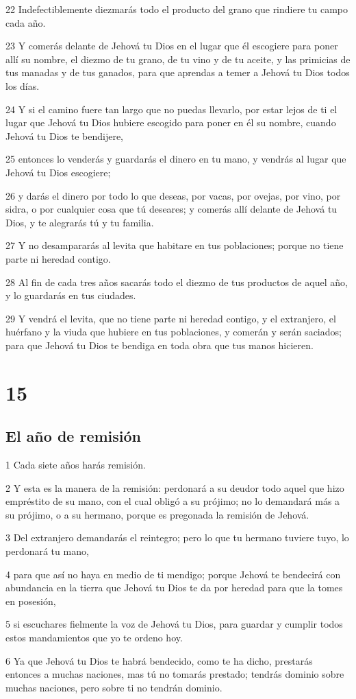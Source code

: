 \par 22 Indefectiblemente diezmarás  todo el producto del grano que rindiere tu campo cada año.
\par 23 Y comerás delante de Jehová tu Dios en el lugar que él escogiere para poner allí su nombre, el diezmo de tu grano, de tu vino y de tu aceite, y las primicias de tus manadas y de tus ganados, para que aprendas a temer a Jehová tu Dios todos los días.
\par 24 Y si el camino fuere tan largo que no puedas llevarlo, por estar lejos de ti el lugar que Jehová tu Dios hubiere escogido para poner en él su nombre, cuando Jehová tu Dios te bendijere,
\par 25 entonces lo venderás y guardarás el dinero en tu mano, y vendrás al lugar que Jehová tu Dios escogiere;
\par 26 y darás el dinero por todo lo que deseas, por vacas, por ovejas, por vino, por sidra, o por cualquier cosa que tú deseares; y comerás allí delante de Jehová tu Dios, y te alegrarás tú y tu familia.
\par 27 Y no desampararás al levita que habitare en tus poblaciones; porque no tiene parte ni heredad contigo.
\par 28 Al fin de cada tres años sacarás todo el diezmo de tus productos de aquel año, y lo guardarás en tus ciudades.
\par 29 Y vendrá el levita, que no tiene parte ni heredad contigo, y el extranjero, el huérfano y la viuda que hubiere en tus poblaciones, y comerán y serán saciados; para que Jehová tu Dios te bendiga en toda obra que tus manos hicieren.

\chapter{15}

\section{El año de remisión}

\par 1 Cada siete años harás remisión.
\par 2 Y esta es la manera de la remisión: perdonará a su deudor todo aquel que hizo empréstito de su mano, con el cual obligó a su prójimo; no lo demandará más a su prójimo, o a su hermano, porque es pregonada la remisión de Jehová.
\par 3 Del extranjero demandarás el reintegro; pero lo que tu hermano tuviere tuyo, lo perdonará tu mano,
\par 4 para que así no haya en medio de ti mendigo; porque Jehová te bendecirá con abundancia en la tierra que Jehová tu Dios te da por heredad para que la tomes en posesión,
\par 5 si escuchares fielmente la voz de Jehová tu Dios, para guardar y cumplir todos estos mandamientos que yo te ordeno hoy.
\par 6 Ya que Jehová tu Dios te habrá bendecido, como te ha dicho, prestarás entonces a muchas naciones, mas tú no tomarás prestado; tendrás dominio sobre muchas naciones, pero sobre ti no tendrán dominio. 

